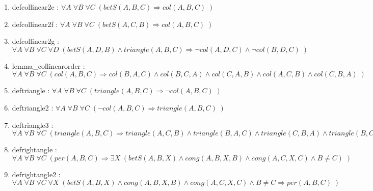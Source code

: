 \documentclass{article}
\begin{document}
\begin{enumerate}
\item defcollinear2e : $\forall A \; \forall B \; \forall C \; ( betS(A, B, C) \Rightarrow col(A, B, C)\;)$
\item defcollinear2f : $\forall A \; \forall B \; \forall C \; ( betS(A, C, B) \Rightarrow col(A, B, C)\;)$
\item defcollinear2g : $\forall A \; \forall B \; \forall C \; \forall D \; ( betS(A, D, B)\wedge triangle(A, B, C) \Rightarrow \neg col(A, D, C)\wedge \neg col(B, D, C)\;)$
\item lemma\_collinearorder : $\forall A \; \forall B \; \forall C \; ( col(A, B, C) \Rightarrow col(B, A, C)\wedge col(B, C, A)\wedge col(C, A, B)\wedge col(A, C, B)\wedge col(C, B, A)\;)$
\item deftriangle : $\forall A \; \forall B \; \forall C \; ( triangle(A, B, C) \Rightarrow \neg col(A, B, C)\;)$
\item deftriangle2 : $\forall A \; \forall B \; \forall C \; ( \neg col(A, B, C) \Rightarrow triangle(A, B, C)\;)$
\item deftriangle3 : $\forall A \; \forall B \; \forall C \; ( triangle(A, B, C) \Rightarrow triangle(A, C, B)\wedge triangle(B, A, C)\wedge triangle(C, B, A)\wedge triangle(B, C, A)\wedge triangle(C, A, B)\;)$
\item defrightangle : $\forall A \; \forall B \; \forall C \; ( per(A, B, C) \Rightarrow \exists X \; (betS(A, B, X)\wedge cong(A, B, X, B)\wedge cong(A, C, X, C)\wedge B \neq C)\;)$
\item defrightangle2 : $\forall A \; \forall B \; \forall C \; \forall X \; ( betS(A, B, X)\wedge cong(A, B, X, B)\wedge cong(A, C, X, C)\wedge B \neq C \Rightarrow per(A, B, C)\;)$
\end{enumerate}

\hrulefill
\end{document}
